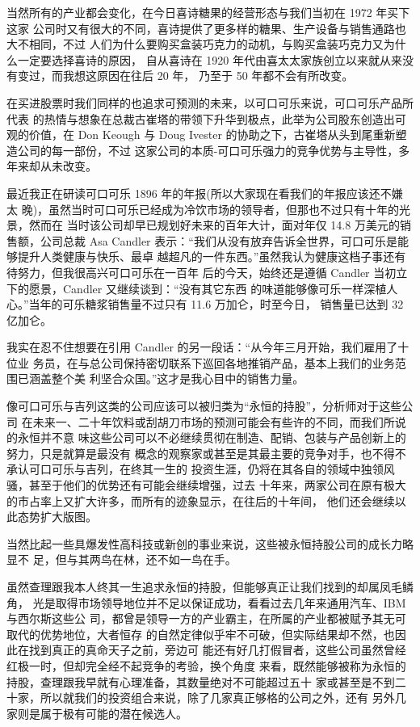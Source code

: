 \documentclass[UTF8,a4paper,zihao=-4,fontset = windows]{ctexart} %
\begin{document}
当然所有的产业都会变化，在今日喜诗糖果的经营形态与我们当初在 1972 年买下这家
公司时又有很大的不同，喜诗提供了更多样的糖果、生产设备与销售通路也大不相同，不过
人们为什么要购买盒装巧克力的动机，与购买盒装巧克力又为什么一定要选择喜诗的原因，
自从喜诗在 1920 年代由喜太太家族创立以来就从来没有变过，而我想这原因在往后 20 年，
乃至于 50 年都不会有所改变。

在买进股票时我们同样的也追求可预测的未来，以可口可乐来说，可口可乐产品所代表
的热情与想象在总裁古崔塔的带领下升华到极点，此举为公司股东创造出可观的价值，在
Don Keough 与 Doug Ivester 的协助之下，古崔塔从头到尾重新塑造公司的每一部份，不过
这家公司的本质-可口可乐强力的竞争优势与主导性，多年来却从未改变。

最近我正在研读可口可乐 1896 年的年报(所以大家现在看我们的年报应该还不嫌太
晚)，虽然当时可口可乐已经成为冷饮市场的领导者，但那也不过只有十年的光景，然而在
当时该公司却早已规划好未来的百年大计，面对年仅 14.8 万美元的销售额，公司总裁 Asa
Candler 表示：“我们从没有放弃告诉全世界，可口可乐是能够提升人类健康与快乐、最卓
越超凡的一件东西。”虽然我认为健康这档子事还有待努力，但我很高兴可口可乐在一百年
后的今天，始终还是遵循 Candler 当初立下的愿景，Candler 又继续谈到：“没有其它东西
的味道能够像可乐一样深植人心。”当年的可乐糖浆销售量不过只有 11.6 万加仑，时至今日，
销售量已达到 32 亿加仑。

我实在忍不住想要在引用 Candler 的另一段话：“从今年三月开始，我们雇用了十位业
务员，在与总公司保持密切联系下巡回各地推销产品，基本上我们的业务范围已涵盖整个美
利坚合众国。”这才是我心目中的销售力量。

像可口可乐与吉列这类的公司应该可以被归类为“永恒的持股”，分析师对于这些公司
在未来一、二十年饮料或刮胡刀市场的预测可能会有些许的不同，而我们所说的永恒并不意
味这些公司可以不必继续贯彻在制造、配销、包装与产品创新上的努力，只是就算是最没有
概念的观察家或甚至是其最主要的竞争对手，也不得不承认可口可乐与吉列，在终其一生的
投资生涯，仍将在其各自的领域中独领风骚，甚至于他们的优势还有可能会继续增强，过去
十年来，两家公司在原有极大的市占率上又扩大许多，而所有的迹象显示，在往后的十年间，
他们还会继续以此态势扩大版图。

当然比起一些具爆发性高科技或新创的事业来说，这些被永恒持股公司的成长力略显不
足，但与其两鸟在林，还不如一鸟在手。

虽然查理跟我本人终其一生追求永恒的持股，但能够真正让我们找到的却属凤毛鳞角，
光是取得市场领导地位并不足以保证成功，看看过去几年来通用汽车、IBM 与西尔斯这些公
司，都曾是领导一方的产业霸主，在所属的产业都被赋予其无可取代的优势地位，大者恒存
的自然定律似乎牢不可破，但实际结果却不然，也因此在找到真正的真命天子之前，旁边可
能还有好几打假冒者，这些公司虽然曾经红极一时，但却完全经不起竞争的考验，换个角度
来看，既然能够被称为永恒的持股，查理跟我早就有心理准备，其数量绝对不可能超过五十
家或甚至是不到二十家，所以就我们的投资组合来说，除了几家真正够格的公司之外，还有
另外几家则是属于极有可能的潜在候选人。
\end{document}
